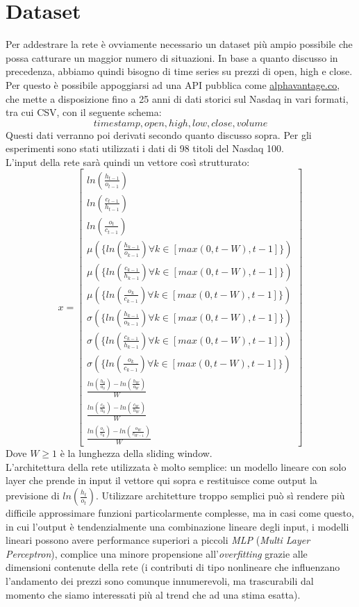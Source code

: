 \documentclass[binding=0.6cm]{sapthesis}
\begin{document}
		\section{Dataset}
			Per addestrare la rete è ovviamente necessario un dataset più ampio possibile che possa catturare un maggior numero di situazioni. In base a quanto discusso in precedenza, abbiamo quindi
			bisogno di time series su prezzi di open, high e close. Per questo è possibile appoggiarsi ad una API pubblica come \underline{\url{alphavantage.co}}, che mette a disposizione fino a 25 anni
			di dati storici sul Nasdaq in vari formati, tra cui CSV, con il seguente schema:
			\[ timestamp,open,high,low,close,volume \]
			Questi dati verranno poi derivati secondo quanto discusso sopra. Per gli esperimenti sono stati utilizzati i dati di 98 titoli del Nasdaq 100. \\
			L'input della rete sarà quindi un vettore così strutturato:
			\[
				x = \begin{bmatrix}
						ln(\frac{h_{t-1}}{o_{t-1}}) \\
						ln(\frac{c_{t-1}}{h_{t-1}}) \\
						ln(\frac{o_{t}}{c_{t-1}}) \\
						\mu(\{ ln(\frac{h_{k-1}}{o_{k-1}}) \forall k \in [max(0, t-W), t-1] \}) \\
						\mu(\{ ln(\frac{c_{k-1}}{h_{k-1}}) \forall k \in [max(0, t-W), t-1] \}) \\
						\mu(\{ ln(\frac{o_{k}}{c_{k-1}}) \forall k \in [max(0, t-W), t-1] \}) \\
						\sigma(\{ ln(\frac{h_{k-1}}{o_{k-1}}) \forall k \in [max(0, t-W), t-1] \}) \\
						\sigma(\{ ln(\frac{c_{k-1}}{h_{k-1}}) \forall k \in [max(0, t-W), t-1] \}) \\
						\sigma(\{ ln(\frac{o_{k}}{c_{k-1}}) \forall k \in [max(0, t-W), t-1] \}) \\
						\frac{ln(\frac{h_{0}}{o_{0}}) - ln(\frac{h_{W}}{o_{W}})}{W} \\
						\frac{ln(\frac{c_{0}}{h_{0}}) - ln(\frac{c_{W}}{h_{W}})}{W} \\
						\frac{ln(\frac{o_{1}}{c_{0}}) - ln(\frac{o_{W}}{c_{W-1}})}{W}
				\end{bmatrix}
			\]
			Dove $W \geq 1$ è la lunghezza della sliding window. \\
			L'architettura della rete utilizzata è molto semplice: un modello lineare con solo layer che prende in input il vettore qui sopra e restituisce come output la previsione di $ln(\frac{h_{t}}{o_{t}})$.
			Utilizzare architetture troppo semplici può sì rendere più difficile approssimare funzioni particolarmente complesse, ma in casi come questo, in cui l'output è tendenzialmente una combinazione lineare
			degli input, i modelli lineari possono avere performance superiori a piccoli \textit{MLP} (\textit{Multi Layer Perceptron}), complice una minore propensione all'\textit{overfitting} grazie alle dimensioni
			contenute della rete (i contributi di tipo nonlineare che influenzano l'andamento dei prezzi sono comunque innumerevoli, ma trascurabili dal momento che siamo interessati più al trend che ad una stima esatta).
		\newpage
\end{document}
